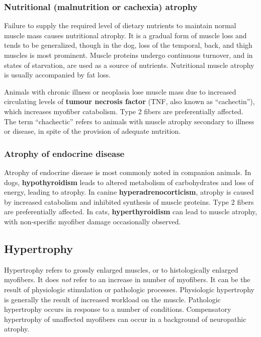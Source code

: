 \documentclass[openany]{book}
\begin{document}
\subsubsection{Nutritional (malnutrition or cachexia)
atrophy}\label{nutritional-malnutrition-or-cachexia-atrophy}

Failure to supply the required level of dietary nutrients to maintain
normal muscle mass causes nutritional atrophy. It is a gradual form of
muscle loss and tends to be generalized, though in the dog, loss of the
temporal, back, and thigh muscles is most prominent. Muscle proteins
undergo continuous turnover, and in states of starvation, are used as a
source of nutrients. Nutritional muscle atrophy is usually accompanied
by fat loss.

Animals with chronic illness or neoplasia lose muscle mass due to
increased circulating levels of \textbf{tumour necrosis factor} (TNF,
also known as ``cachectin''), which increases myofiber catabolism. Type
2 fibers are preferentially affected. The term ``chachectic'' refers to
animals with muscle atrophy secondary to illness or disease, in spite of
the provision of adequate nutrition.

\subsubsection{Atrophy of endocrine
disease}\label{atrophy-of-endocrine-disease}

Atrophy of endocrine disease is most commonly noted in companion
animals. In dogs, \textbf{hypothyroidism} leads to altered metabolism of
carbohydrates and loss of energy, leading to atrophy. In canine
\textbf{hyperadrenocorticism}, atrophy is caused by increased catabolism
and inhibited synthesis of muscle proteins. Type 2 fibers are
preferentially affected. In cats, \textbf{hyperthyroidism} can lead to
muscle atrophy, with non-specific myofiber damage occasionally observed.

\subsection{Hypertrophy}\label{hypertrophy}

Hypertrophy refers to grossly enlarged muscles, or to histologically
enlarged myofibers. It does \emph{not} refer to an increase in number of
myofibers. It can be the result of physiologic stimulation or pathologic
processes. Physiologic hypertrophy is generally the result of increased
workload on the muscle. Pathologic hypertrophy occurs in response to a
number of conditions. Compensatory hypertrophy of unaffected myofibers
can occur in a background of neuropathic atrophy.
\end{document}
